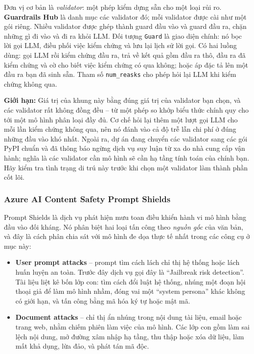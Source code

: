 Đơn vị cơ bản là \emph{validator}: một phép kiểm dựng sẵn cho một loại rủi ro. \textbf{Guardrails Hub} là danh mục các validator đó; mỗi validator được cài như một gói riêng. Nhiều validator được ghép thành guard đầu vào và guard đầu ra, chặn những gì đi vào và đi ra khỏi LLM. Đối tượng \texttt{Guard} là giao diện chính: nó bọc lời gọi LLM, điều phối việc kiểm chứng và lưu lại lịch sử lời gọi. Có hai luồng dùng: gọi LLM rồi kiểm chứng đầu ra, trả về kết quả gồm đầu ra thô, đầu ra đã kiểm chứng và cờ cho biết việc kiểm chứng có qua không; hoặc áp đặc tả lên một đầu ra bạn đã sinh sẵn. Tham số \texttt{num\_reasks} cho phép hỏi lại LLM khi kiểm chứng không qua.

\textbf{Giới hạn:} Giá trị của khung này bằng đúng giá trị của validator bạn chọn, và các validator rất không đồng đều -- từ một phép so khớp biểu thức chính quy cho tới một mô hình phân loại đầy đủ. Cơ chế hỏi lại thêm một lượt gọi LLM cho mỗi lần kiểm chứng không qua, nên nó đánh vào cả độ trễ lẫn chi phí ở đúng những đầu vào khó nhất. Ngoài ra, dự án đang chuyển các validator sang các gói PyPI chuẩn và đã thông báo ngừng dịch vụ suy luận từ xa do nhà cung cấp vận hành; nghĩa là các validator cần mô hình sẽ cần hạ tầng tính toán của chính bạn. Hãy kiểm tra tình trạng di trú này trước khi chọn một validator làm thành phần cốt lõi.

\subsubsection{Azure AI Content Safety Prompt Shields}

Prompt Shields là dịch vụ phát hiện mưu toan điều khiển hành vi mô hình bằng đầu vào đối kháng. Nó phân biệt hai loại tấn công theo \emph{nguồn gốc} của văn bản, và đây là cách phân chia sát với mô hình đe dọa thực tế nhất trong các công cụ ở mục này:

\begin{itemize}
	\item \textbf{User prompt attacks} -- prompt tìm cách lách chỉ thị hệ thống hoặc lách huấn luyện an toàn. Trước đây dịch vụ gọi đây là ``Jailbreak risk detection''. Tài liệu liệt kê bốn lớp con: tìm cách đổi luật hệ thống, nhúng một đoạn hội thoại giả để làm mô hình nhầm, đóng vai một ``system persona'' khác không có giới hạn, và tấn công bằng mã hóa ký tự hoặc mật mã.
	\item \textbf{Document attacks} -- chỉ thị ẩn nhúng trong nội dung tài liệu, email hoặc trang web, nhằm chiếm phiên làm việc của mô hình. Các lớp con gồm làm sai lệch nội dung, mở đường xâm nhập hạ tầng, thu thập hoặc xóa dữ liệu, làm mất khả dụng, lừa đảo, và phát tán mã độc.
\end{itemize}

